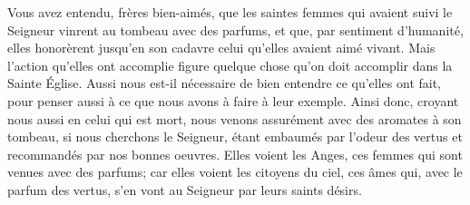 Vous avez entendu, frères bien-aimés,
	que les saintes femmes qui avaient suivi le Seigneur
	vinrent au tombeau avec des parfums,
	et que, par sentiment d’humanité,
	elles honorèrent jusqu’en son cadavre
		celui qu’elles avaient aimé vivant.
Mais l’action qu’elles ont accomplie
	figure quelque chose qu’on doit accomplir dans la Sainte Église.
Aussi nous est-il nécessaire de bien entendre ce qu’elles ont fait,
	pour penser aussi à ce que nous avons à faire à leur exemple.
Ainsi donc, croyant nous aussi en celui qui est mort,
	nous venons assurément avec des aromates à son tombeau,
		si nous cherchons le Seigneur,
	étant embaumés par l’odeur des vertus et recommandés par nos bonnes oeuvres.
Elles voient les Anges, ces femmes qui sont venues avec des parfums;
	car elles voient les citoyens du ciel,
	ces âmes qui, avec le parfum des vertus,
		s’en vont au Seigneur par leurs saints désirs.
